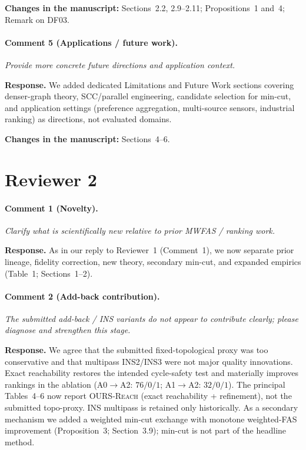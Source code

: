 \documentclass[11pt]{article}
\newcommand{\commentbox}[1]{\par\textit{#1}\par\medskip}
\newcommand{\changes}[1]{\textbf{Changes in the manuscript:} #1\par\medskip}
\begin{document}
\changes{Sections~2.2, 2.9--2.11; Propositions~1 and~4; Remark on DF03.}

\paragraph{Comment 5 (Applications / future work).}
\commentbox{Provide more concrete future directions and application context.}

\noindent\textbf{Response.}
We added dedicated Limitations and Future Work sections covering denser-graph theory, SCC/parallel engineering, candidate selection for min-cut, and application settings (preference aggregation, multi-source sensors, industrial ranking) as directions, not evaluated domains.

\changes{Sections~4--6.}

\section*{Reviewer 2}

\paragraph{Comment 1 (Novelty).}
\commentbox{Clarify what is scientifically new relative to prior MWFAS / ranking work.}

\noindent\textbf{Response.}
As in our reply to Reviewer~1 (Comment~1), we now separate prior lineage, fidelity correction, new theory, secondary min-cut, and expanded empirics (Table~1; Sections~1--2).

\paragraph{Comment 2 (Add-back contribution).}
\commentbox{The submitted add-back / INS variants do not appear to contribute clearly; please diagnose and strengthen this stage.}

\noindent\textbf{Response.}
We agree that the submitted fixed-topological proxy was too conservative and that multipass INS2/INS3 were not major quality innovations. Exact reachability restores the intended cycle-safety test and materially improves rankings in the ablation (A0$\to$A2: $76/0/1$; A1$\to$A2: $32/0/1$). The principal Tables~4--6 now report \textsc{OURS-Reach} (exact reachability + refinement), not the submitted topo-proxy. INS multipass is retained only historically. As a secondary mechanism we added a weighted min-cut exchange with monotone weighted-FAS improvement (Proposition~3; Section~3.9); min-cut is not part of the headline method.
\end{document}
